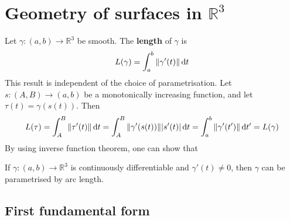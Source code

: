 \documentclass[a4paper]{article}
\begin{document}
\section{Geometry of surfaces in \( \mathbb R^3 \)}

Let \( \gamma \colon (a,b) \to \mathbb R^3 \) be smooth.
The \textbf{length} of \( \gamma \) is
\[
	L(\gamma) = \int_a^b \norm{\gamma'(t)} \dd{t}
\]
This result is independent of the choice of parametrisation.
Let \( s \colon (A,B) \to (a,b) \) be a monotonically increasing function, and let \( \tau(t) = \gamma(s(t)) \).
Then
\[
	L(\tau) = \int_A^B \norm{\tau'(t)} \dd{t} = \int_A^B \norm{\gamma'(s(t))} \abs{s'(t)} \dd{t} = \int_a^b \norm{\gamma'(t')} \dd{t'} = L(\gamma)
\]
By using inverse function theorem, one can show that
\begin{lemma}
	If \( \gamma \colon (a,b) \to \mathbb R^3 \) is continuously differentiable and \( \gamma'(t) \neq 0 \), then \( \gamma \) can be parametrised by arc length.
\end{lemma}

\subsection{First fundamental form}
\end{document}
